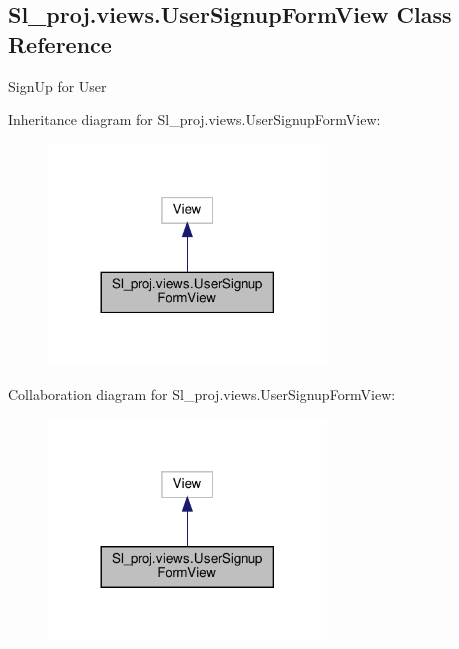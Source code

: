 \hypertarget{classSl__proj_1_1views_1_1UserSignupFormView}{}\subsection{Sl\+\_\+proj.\+views.\+User\+Signup\+Form\+View Class Reference}
\label{classSl__proj_1_1views_1_1UserSignupFormView}


Sign\+Up for User  




Inheritance diagram for Sl\+\_\+proj.\+views.\+User\+Signup\+Form\+View\+:\nopagebreak
\begin{figure}[H]
\begin{center}
\leavevmode
\includegraphics[width=209pt]{classSl__proj_1_1views_1_1UserSignupFormView__inherit__graph}
\end{center}
\end{figure}


Collaboration diagram for Sl\+\_\+proj.\+views.\+User\+Signup\+Form\+View\+:\nopagebreak
\begin{figure}[H]
\begin{center}
\leavevmode
\includegraphics[width=209pt]{classSl__proj_1_1views_1_1UserSignupFormView__coll__graph}
\end{center}
\end{figure}
